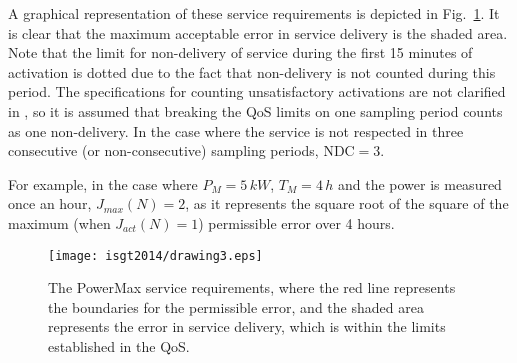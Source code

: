 A graphical representation of these service requirements is depicted in Fig.~\ref{fig:servicereq}. It is clear that the maximum acceptable error in service delivery is the shaded area. Note that the limit for non-delivery of service during the first 15 minutes of activation is dotted due to the fact that non-delivery is not counted during this period. The specifications for counting unsatisfactory activations are not clarified in \cite{FLECH}, so it is assumed that breaking the QoS limits on one sampling period counts as one non-delivery. In the case where the service is not respected in three consecutive (or non-consecutive) sampling periods, $\text{NDC}=3$.

For example, in the case where  $P_M = 5\,kW$, $T_M=4\, h$ and the power is measured once an hour, $J_{max}(N) = 2$, as it represents the square root of the square of the maximum (when $J_{act}(N)=1$) permissible error over 4 hours.
\begin{figure}[t]  %
	\centering
	\texttt{[image: isgt2014/drawing3.eps]}
	\caption{The PowerMax service requirements, where the red line represents the boundaries for the permissible error, and the shaded area represents the error in service delivery, which is within the limits established in the QoS. }\label{fig:servicereq}
\end{figure}

	
